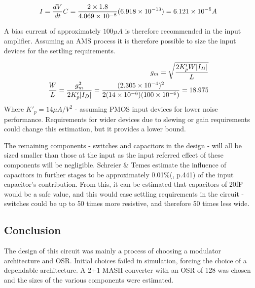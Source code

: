     \begin{align}
        I = \frac{dV}{dt}C = \frac{2\times 1.8}{4.069\times 10^{-8}}(6.918\times 10^{-13}) = 6.121\times 10^{-5} A
    \end{align}
    
    A bias current of approximately $100\mu A$ is therefore recommended in the input amplifier.
    Assuming an AMS process it is therefore possible to size the input devices for the settling requirements.
    
    \begin{align}
        g_{m} = \sqrt{\frac{2K'_{p} W |I_{D}|}{L}} \\
        \frac{W}{L} = \frac{g_{m}^{2}}{2K'_{p} |I_{D}|} = \frac{(2.305\times 10^{-4})^{2}}{2(14\times 10^{-6})(100\times 10^{-6})} = 18.975
    \end{align}
    Where $K'_{p} = 14\mu A/V^{2}$ - assuming PMOS input devices for lower noise performance.
    Requirements for wider devices due to slewing or gain requirements could change this estimation, but it provides a lower bound.

    The remaining components - switches and capacitors in the design - will all be sized smaller than those at the input as the input referred effect of these components will be negligible.
    Schreier \& Temes estimate the influence of capacitors in further stages to be approximately 0.01\%(\cite{Steensgaard2004}, p.441) of the input capacitor's contribution.
    From this, it can be estimated that capacitors of 20fF would be a safe value, and this would ease settling requirements in the circuit - switches could be up to 50 times more resistive, and therefore 50 times less wide.

\subsection{Conclusion}
\label{Design:conclusion}
The design of this circuit was mainly a process of choosing a modulator architecture and OSR.
Initial choices failed in simulation, forcing the choice of a dependable architecture.
A 2+1 MASH converter with an OSR of 128 was chosen and the sizes of the various components were estimated.

